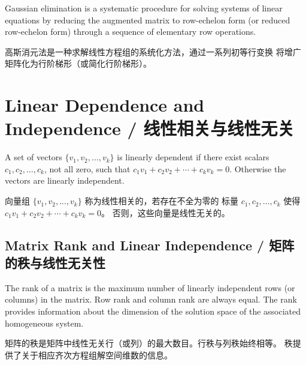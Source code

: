 \begin{original}
Gaussian elimination is a systematic procedure for solving systems of
linear equations by reducing the augmented matrix to row-echelon form
(or reduced row-echelon form) through a sequence of elementary row
operations.
\end{original}
\begin{translation}
高斯消元法是一种求解线性方程组的系统化方法，通过一系列初等行变换
将增广矩阵化为行阶梯形（或简化行阶梯形）。
\end{translation}

\section{Linear Dependence and Independence / 线性相关与线性无关}

\begin{original}
A set of vectors $\{v_1, v_2, \ldots, v_k\}$ is linearly dependent if
there exist scalars $c_1, c_2, \ldots, c_k$, not all zero, such that
$c_1 v_1 + c_2 v_2 + \cdots + c_k v_k = 0$.  Otherwise the vectors are
linearly independent.
\end{original}
\begin{translation}
向量组 $\{v_1, v_2, \ldots, v_k\}$ 称为线性相关的，若存在不全为零的
标量 $c_1, c_2, \ldots, c_k$ 使得
$c_1 v_1 + c_2 v_2 + \cdots + c_k v_k = 0$。
否则，这些向量是线性无关的。
\end{translation}

\subsection{Matrix Rank and Linear Independence / 矩阵的秩与线性无关性}

\begin{original}
The rank of a matrix is the maximum number of linearly independent
rows (or columns) in the matrix.  Row rank and column rank are always
equal.  The rank provides information about the dimension of the
solution space of the associated homogeneous system.
\end{original}
\begin{translation}
矩阵的秩是矩阵中线性无关行（或列）的最大数目。行秩与列秩始终相等。
秩提供了关于相应齐次方程组解空间维数的信息。
\end{translation}

